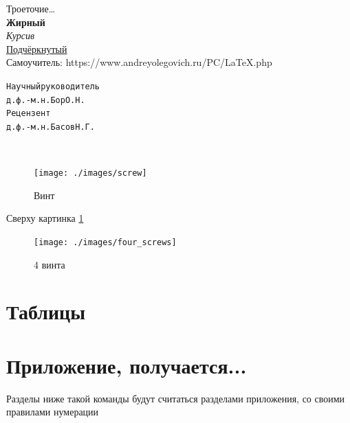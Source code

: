 Троеточие\ldots\\
\textbf{Жирный}\\
\textit{Курсив}\\
\underline{Подчёркнутый}\\
Самоучитель: https://www.andreyolegovich.ru/PC/LaTeX.php

\begin{alltt}
  Научный руководитель
  д.ф.-м.н. Бор О.Н.
  Рецензент
  д.ф.-м.н. Басов Н.Г.
\end{alltt}

\lipsum[3]\\
\lipsum[2]

\begin{figure}[H]
  \centering
  \texttt{[image: ./images/screw]}
  \caption{Винт}
  \label{figure:screw}
\end{figure}

\clearpage %

Сверху картинка \ref{figure:screw}

\begin{figure}[H]
  \centering
  \texttt{[image: ./images/four\_screws]}
  \caption{4 винта}
  \label{figure:four_screws}
\end{figure}


\section{Таблицы}

\thispagestyle{empty}

\appendix
\section{Приложение, получается...}
Разделы ниже такой команды будут считаться разделами приложения, со своими
правилами нумерации


